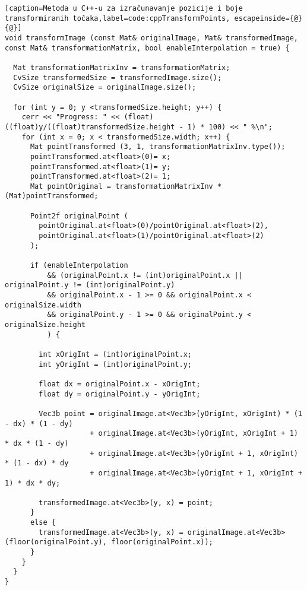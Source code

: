 \begin{lstlisting}[caption=Metoda u C++-u za izračunavanje pozicije i boje transformiranih točaka,label=code:cppTransformPoints, escapeinside={@}{@}]
void transformImage (const Mat& originalImage, Mat& transformedImage, const Mat& transformationMatrix, bool enableInterpolation = true) {
  
  Mat transformationMatrixInv = transformationMatrix;
  CvSize transformedSize = transformedImage.size();
  CvSize originalSize = originalImage.size();

  for (int y = 0; y <transformedSize.height; y++) {
    cerr << "Progress: " << (float)((float)y/((float)transformedSize.height - 1) * 100) << " %\n";
    for (int x = 0; x < transformedSize.width; x++) {
      Mat pointTransformed (3, 1, transformationMatrixInv.type());
      pointTransformed.at<float>(0)= x;
      pointTransformed.at<float>(1)= y;
      pointTransformed.at<float>(2)= 1;
      Mat pointOriginal = transformationMatrixInv * (Mat)pointTransformed;

      Point2f originalPoint ( 
        pointOriginal.at<float>(0)/pointOriginal.at<float>(2),
        pointOriginal.at<float>(1)/pointOriginal.at<float>(2)
      );
      
      if (enableInterpolation
          && (originalPoint.x != (int)originalPoint.x || originalPoint.y != (int)originalPoint.y)
          && originalPoint.x - 1 >= 0 && originalPoint.x < originalSize.width
          && originalPoint.y - 1 >= 0 && originalPoint.y < originalSize.height
          ) {
        
        int xOrigInt = (int)originalPoint.x;
        int yOrigInt = (int)originalPoint.y;

        float dx = originalPoint.x - xOrigInt;
        float dy = originalPoint.y - yOrigInt;

        Vec3b point = originalImage.at<Vec3b>(yOrigInt, xOrigInt) * (1 - dx) * (1 - dy)
                    + originalImage.at<Vec3b>(yOrigInt, xOrigInt + 1) * dx * (1 - dy)
                    + originalImage.at<Vec3b>(yOrigInt + 1, xOrigInt) * (1 - dx) * dy
                    + originalImage.at<Vec3b>(yOrigInt + 1, xOrigInt + 1) * dx * dy;

        transformedImage.at<Vec3b>(y, x) = point;
      }
      else {
        transformedImage.at<Vec3b>(y, x) = originalImage.at<Vec3b>(floor(originalPoint.y), floor(originalPoint.x));
      }
    }
  }
}
\end{lstlisting}